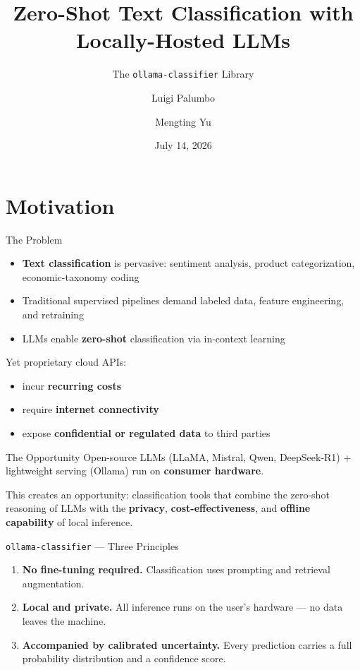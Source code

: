 \documentclass[aspectratio=169,11pt]{beamer}
\title{Zero-Shot Text Classification with Locally-Hosted LLMs}
\subtitle{The \texttt{ollama-classifier} Library}
\author{Luigi Palumbo \and Mengting Yu}
\date{July 14, 2026}
\begin{document}
\maketitle

\section{Motivation}

\begin{frame}{The Problem}
  \begin{itemize}
    \item \textbf{Text classification} is pervasive: sentiment analysis,
          product categorization, economic-taxonomy coding
    \item Traditional supervised pipelines demand labeled data, feature
          engineering, and retraining
    \item LLMs enable \textbf{zero-shot} classification via in-context learning
  \end{itemize}
  \vspace{0.4em}
  Yet proprietary cloud APIs:
  \begin{itemize}
    \item incur \textbf{recurring costs}
    \item require \textbf{internet connectivity}
    \item expose \textbf{confidential or regulated data} to third parties
  \end{itemize}
\end{frame}

\begin{frame}{The Opportunity}
  Open-source LLMs (LLaMA, Mistral, Qwen, DeepSeek-R1) + lightweight serving
  (Ollama) run on \textbf{consumer hardware}.

  \vspace{0.6em}
  This creates an opportunity: classification tools that combine the zero-shot
  reasoning of LLMs with the \textbf{privacy}, \textbf{cost-effectiveness}, and
  \textbf{offline capability} of local inference.
\end{frame}

\begin{frame}{\texttt{ollama-classifier} — Three Principles}
  \begin{enumerate}
    \item \textbf{No fine-tuning required.} Classification uses prompting and
          retrieval augmentation.
    \item \textbf{Local and private.} All inference runs on the user's
          hardware — no data leaves the machine.
    \item \textbf{Accompanied by calibrated uncertainty.} Every prediction
          carries a full probability distribution and a confidence score.
  \end{enumerate}
\end{frame}
\end{document}
